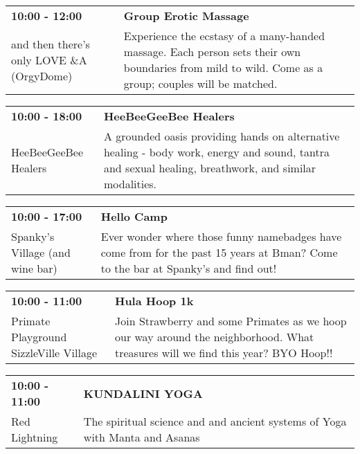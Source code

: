 \begin{tabular}{ p{1in} p{2.2in} }
    \textbf{10:00 - 12:00} & \textbf{Group Erotic Massage} \\
    and then there's only LOVE \newline 4\&A (OrgyDome) & Experience the ecstasy of a many-handed massage. Each person sets their own boundaries from mild to wild. Come as a group; couples will be matched. \\
    \hline 
\end{tabular}
    
\begin{tabular}{ p{1in} p{2.2in} }
    \textbf{10:00 - 18:00} & \textbf{HeeBeeGeeBee Healers} \\
    HeeBeeGeeBee Healers \newline  & A grounded oasis providing hands on alternative healing - body work, energy and sound, tantra and sexual healing, breathwork, and similar modalities. \\
    \hline 
\end{tabular}
    
\begin{tabular}{ p{1in} p{2.2in} }
    \textbf{10:00 - 17:00} & \textbf{Hello Camp} \\
    Spanky's Village (and wine bar) \newline  & Ever wonder where those funny namebadges have come from for the past 15 years at Bman?  Come to the bar at Spanky's and find out! \\
    \hline 
\end{tabular}
    
\begin{tabular}{ p{1in} p{2.2in} }
    \textbf{10:00 - 11:00} & \textbf{Hula Hoop 1k} \\
    Primate Playground \newline SizzleVille Village & Join Strawberry and some Primates as we hoop our way around the neighborhood. What treasures will we find this year? BYO Hoop!! \\
    \hline 
\end{tabular}
    
\begin{tabular}{ p{1in} p{2.2in} }
    \textbf{10:00 - 11:00} & \textbf{KUNDALINI YOGA } \\
    Red Lightning \newline  & The spiritual science and and ancient systems of Yoga with Manta and Asanas \\
    \hline 
\end{tabular}
    
